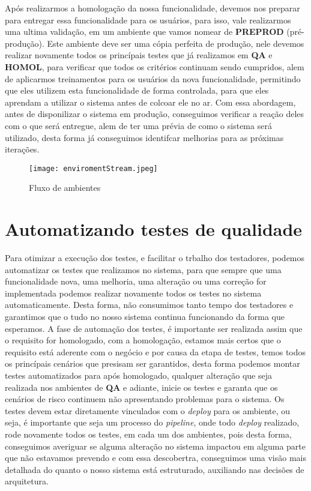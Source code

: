       Após realizarmos a homologação da nossa funcionalidade, devemos nos preparar
      para entregar essa funcionalidade para os usuários, para isso, vale realizarmos
      uma ultima validação, em um ambiente que vamos nomear de \textbf{PREPROD}
      (pré-produção). Este ambiente deve ser uma cópia perfeita de produção, nele
      devemos realizar novamente todos os princípais testes que já realizamos em
      \textbf{QA} e \textbf{HOMOL}, para verificar que todos os critérios continuam
      sendo cumpridos, alem de aplicarmos treinamentos para os usuários da nova
      funcionalidade, permitindo que eles utilizem esta funcionalidade de forma
      controlada, para que eles aprendam a utilizar o sistema antes de colcoar ele
      no ar. Com essa abordagem, antes de disponilizar o sistema em produção,
      conseguimos verificar a reação deles com o que será entregue, alem de ter uma
      prévia de como o sistema será utilizado, desta forma já conseguimos identifcar
      melhorias para as próximas iterações. \newline

      \begin{figure}[!h]
        \centering
        \texttt{[image: enviromentStream.jpeg]}
        \caption{Fluxo de ambientes}
        \label{Imagem:1}
      \end{figure}

    \section{Automatizando testes de qualidade}
      Para otimizar a execução dos testes, e facilitar o trbalho dos testadores,
      podemos automatizar os testes que realizamos no sistema, para que sempre que
      uma funcionalidade nova, uma melhoria, uma alteração ou uma correção for
      implementada podemos realizar novamente todos os testes no sistema
      automaticamente. Desta forma, não consumimos tanto tempo dos testadores e
      garantimos que o tudo no nosso sistema continua funcionando da forma que
      esperamos. A fase de automação dos testes, é importante ser realizada assim
      que o requisito for homologado, com a homologação, estamos mais certos que o
      requisito está aderente com o negócio e por causa da etapa de testes, temos
      todos os princípais cenários que presisam ser garantidos, desta forma podemos
      montar testes automatizados para após homologado, qualquer alteração que seja
      realizada nos ambientes de \textbf{QA} e adiante, inicie os testes e garanta
      que os cenários de risco continuem não apresentando problemas para o sistema. \newline
      Os testes devem estar diretamente vinculados com o \textit{deploy} para os
      ambiente, ou seja, é importante que seja um processo do \textit{pipeline},
      onde todo \textit{deploy} realizado, rode novamente todos os testes, em cada
      um dos ambientes, pois desta forma, conseguimos averiguar se alguma alteração
      no sistema impactou em alguma parte que não estavamos prevendo e com essa
      descobertra, conseguimos uma visão mais detalhada do quanto o nosso sistema
      está estruturado, auxiliando nas decisões de arquitetura.

